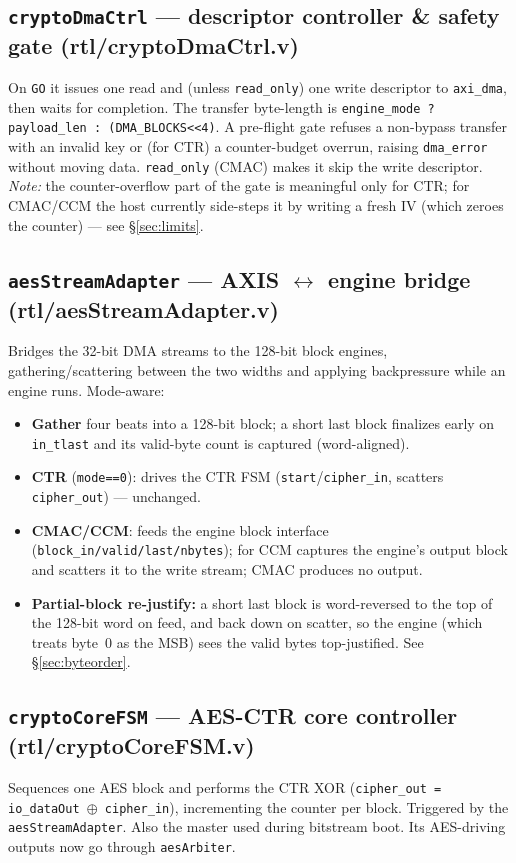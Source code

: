 \documentclass[11pt,a4paper]{article}
\newcommand{\reg}[1]{\texttt{#1}}
\newcommand{\bit}[1]{\texttt{#1}}
\begin{document}
\subsection{\texttt{cryptoDmaCtrl} --- descriptor controller \& safety gate (rtl/cryptoDmaCtrl.v)}
On \bit{GO} it issues one read and (unless \texttt{read\_only}) one write descriptor to
\reg{axi\_dma}, then waits for completion. The transfer byte-length is
\texttt{engine\_mode ? payload\_len : (DMA\_BLOCKS<<4)}. A pre-flight gate refuses a non-bypass
transfer with an invalid key or (for CTR) a counter-budget overrun, raising
\texttt{dma\_error} without moving data. \texttt{read\_only} (CMAC) makes it skip the write
descriptor. \emph{Note:} the counter-overflow part of the gate is meaningful only for CTR; for
CMAC/CCM the host currently side-steps it by writing a fresh IV (which zeroes the counter) ---
see \S\ref{sec:limits}.

\subsection{\texttt{aesStreamAdapter} --- AXIS $\leftrightarrow$ engine bridge (rtl/aesStreamAdapter.v)}
Bridges the 32-bit DMA streams to the 128-bit block engines, gathering/scattering between the
two widths and applying backpressure while an engine runs. Mode-aware:
\begin{itemize}[nosep]
  \item \textbf{Gather} four beats into a 128-bit block; a short last block finalizes early on
        \texttt{in\_tlast} and its valid-byte count is captured (word-aligned).
  \item \textbf{CTR} (\texttt{mode==0}): drives the CTR FSM (\texttt{start}/\texttt{cipher\_in},
        scatters \texttt{cipher\_out}) --- unchanged.
  \item \textbf{CMAC/CCM}: feeds the engine block interface
        (\texttt{block\_in/valid/last/nbytes}); for CCM captures the engine's output block and
        scatters it to the write stream; CMAC produces no output.
  \item \textbf{Partial-block re-justify:} a short last block is word-reversed to the top of the
        128-bit word on feed, and back down on scatter, so the engine (which treats byte~0 as the
        MSB) sees the valid bytes top-justified. See \S\ref{sec:byteorder}.
\end{itemize}

\subsection{\texttt{cryptoCoreFSM} --- AES-CTR core controller (rtl/cryptoCoreFSM.v)}
Sequences one AES block and performs the CTR XOR (\texttt{cipher\_out = io\_dataOut $\oplus$
cipher\_in}), incrementing the counter per block. Triggered by the \reg{aesStreamAdapter}. Also
the master used during bitstream boot. Its AES-driving outputs now go through \reg{aesArbiter}.
\end{document}
